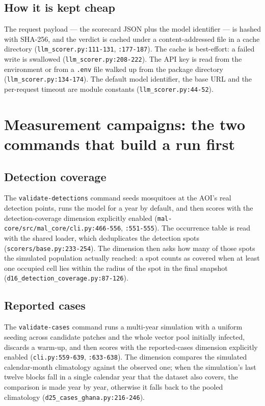 \documentclass[11pt,a4paper]{article}
\newcommand{\code}[1]{\texttt{#1}}
\begin{document}
\subsection{How it is kept cheap}

The request payload --- the scorecard JSON plus the model identifier --- is
hashed with SHA-256, and the verdict is cached under a content-addressed
file in a cache directory (\code{llm\_scorer.py:111-131},
\code{:177-187}). The cache is best-effort: a failed write is swallowed
(\code{llm\_scorer.py:208-222}). The API key is read from the environment or
from a \code{.env} file walked up from the package directory
(\code{llm\_scorer.py:134-174}). The default model identifier, the base URL
and the per-request timeout are module constants
(\code{llm\_scorer.py:44-52}).

\section{Measurement campaigns: the two commands that build a run first}
\label{sec:campaigns}

\subsection{Detection coverage}

The \code{validate-detections} command seeds mosquitoes at the AOI's real
detection points, runs the model for a year by default, and then scores
with the detection-coverage dimension explicitly enabled
(\code{mal-core/src/mal\_core/cli.py:466-556}, \code{:551-555}). The
occurrence table is read with the shared loader, which deduplicates the
detection spots (\code{scorers/base.py:233-254}). The dimension then asks
how many of those spots the simulated population actually reached: a spot
counts as covered when at least one occupied cell lies within the radius of
the spot in the final snapshot (\code{d16\_detection\_coverage.py:87-126}).

\subsection{Reported cases}

The \code{validate-cases} command runs a multi-year simulation with a
uniform seeding across candidate patches and the whole vector pool
initially infected, discards a warm-up, and then scores with the
reported-cases dimension explicitly enabled
(\code{cli.py:559-639}, \code{:633-638}). The dimension compares the
simulated calendar-month climatology against the observed one; when the
simulation's last twelve blocks fall in a single calendar year that the
dataset also covers, the comparison is made year by year, otherwise it falls
back to the pooled climatology (\code{d25\_cases\_ghana.py:216-246}).
\end{document}
